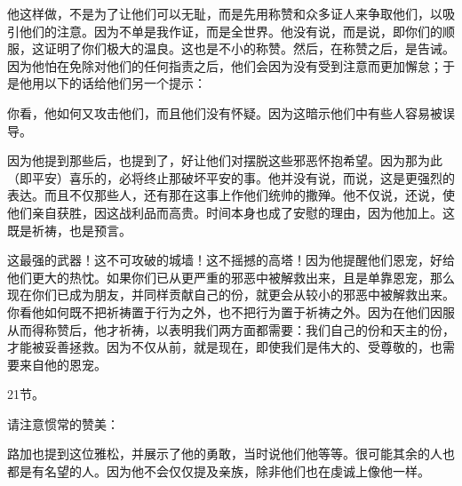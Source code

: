  \par

他这样做，不是为了让他们可以无耻，而是先用称赞和众多证人来争取他们，以吸引他们的注意。因为不单是我作证，而是全世界。他没有说，而是说，即你们的顺服，这证明了你们极大的温良。这也是不小的称赞。然后，在称赞之后，是告诫。因为他怕在免除对他们的任何指责之后，他们会因为没有受到注意而更加懈怠；于是他用以下的话给他们另一个提示：\par

\par

你看，他如何又攻击他们，而且他们没有怀疑。因为这暗示他们中有些人容易被误导。\par

 \par

因为他提到那些后，也提到了，好让他们对摆脱这些邪恶怀抱希望。因为那为此（即平安）喜乐的，必将终止那破坏平安的事。他并没有说，而说，这是更强烈的表达。而且不仅那些人，还有那在这事上作他们统帅的撒殚。他不仅说，还说，使他们亲自获胜，因这战利品而高贵。时间本身也成了安慰的理由，因为他加上。这既是祈祷，也是预言。\par

这最强的武器！这不可攻破的城墙！这不摇撼的高塔！因为他提醒他们恩宠，好给他们更大的热忱。如果你们已从更严重的邪恶中被解救出来，且是单靠恩宠，那么现在你们已成为朋友，并同样贡献自己的份，就更会从较小的邪恶中被解救出来。你看他如何既不把祈祷置于行为之外，也不把行为置于祈祷之外。因为在他们因服从而得称赞后，他才祈祷，以表明我们两方面都需要：我们自己的份和天主的份，才能被妥善拯救。因为不仅从前，就是现在，即使我们是伟大的、受尊敬的，也需要来自他的恩宠。\par

21节。\par

请注意惯常的赞美：\par

路加也提到这位雅松，并展示了他的勇敢，当时说他们他等等。很可能其余的人也都是有名望的人。因为他不会仅仅提及亲族，除非他们也在虔诚上像他一样。\par

